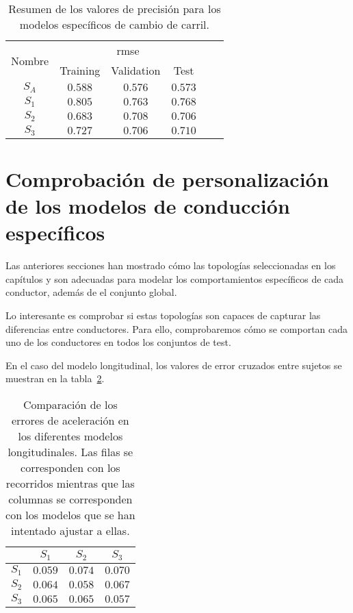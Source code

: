 \begin{table}
	\centering
	\caption[Resumen de los valores de precisión para los modelos específicos de cambio de carril]{Resumen de los valores de precisión para los modelos específicos de cambio de carril.}
	\label{tbl:lc-specific-accuracy}
	\begin{tabular}{cccccc}
		\hline
		\multirow{2}{*}{Nombre} & \multicolumn{3}{c}{\ac{rmse}}      \\ 
		& Training & Validation & Test \\ \hline
		$S_A$ & $0.588$ & $0.576$ & $0.573$  \\
		$S_1$ & $0.805$ & $0.763$ & $0.768$  \\
		$S_2$ & $0.683$ & $0.708$ & $0.706$  \\
		$S_3$ & $0.727$ & $0.706$ & $0.710$  \\ \hline
	\end{tabular}
\end{table}


\section{Comprobación de personalización de los modelos de conducción específicos}

Las anteriores secciones han mostrado cómo las topologías seleccionadas en los capítulos  y  son adecuadas para modelar los comportamientos específicos de cada conductor, además de el conjunto global.

Lo interesante es comprobar si estas topologías son capaces de capturar las diferencias entre conductores. Para ello, comprobaremos cómo se comportan cada uno de los conductores en todos los conjuntos de test.

En el caso del modelo longitudinal, los valores de error cruzados entre sujetos se muestran en la tabla~\ref{tbl:lm-subjects-comparison}.

\begin{table}
	\centering
	\caption[Comparación de los errores de aceleración en los diferentes modelos longitudinales]{Comparación de los errores de aceleración en los diferentes modelos longitudinales. Las filas se corresponden con los recorridos mientras que las columnas se corresponden con los modelos que se han intentado ajustar a ellas.}
	\label{tbl:lm-subjects-comparison}
	\begin{tabular}{c|ccc}
		               & \textbf{$S_1$} & \textbf{$S_2$} & \textbf{$S_3$} \\ \hline
		\textbf{$S_1$} & $0.059$        & $0.074$        & $0.070$ \\
		\textbf{$S_2$} & $0.064$        & $0.058$        & $0.067$ \\
		\textbf{$S_3$} & $0.065$        & $0.065$        & $0.057$ \\ \hline
	\end{tabular}
\end{table}

